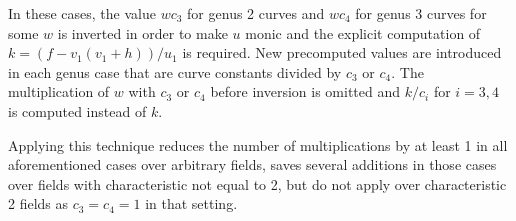 In these cases, the value $wc_3$ for genus 2 curves and $wc_4$ for genus 3
curves for some $w$ is inverted in order to make $u$ monic and the explicit
computation of $k = (f - v_1(v_1 + h))/u_1$ is required. New precomputed values
are introduced in each genus case that are curve constants divided by $c_3$ or
$c_4$. The multiplication of $w$ with $c_3$ or $c_4$ before inversion is omitted
and $k/c_i$ for $i=3,4$ is computed instead of $k$. 

Applying this technique reduces the number of multiplications by at least 1 in
all aforementioned cases over arbitrary fields, saves several additions in those
cases over fields with characteristic not equal to 2, but do not apply over
characteristic 2 fields as $c_3 = c_4 = 1$ in that setting. 

